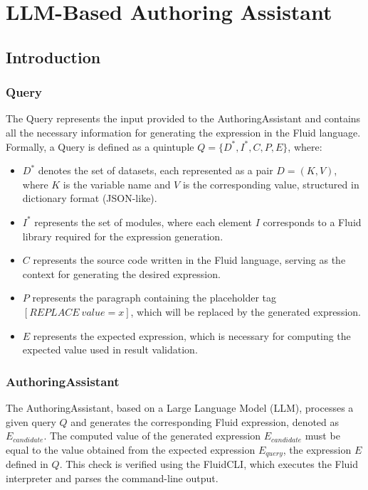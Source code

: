 \section{LLM-Based Authoring Assistant}
\label{sec:llm-based-authoring-assistant}

\subsection{Introduction}
\label{subsec:introduction}

\subsubsection{Query}
The Query represents the input provided to the AuthoringAssistant and contains all the necessary information for generating the expression in the Fluid language.
Formally, a Query is defined as a quintuple $Q = \{D^*, I^*, C, P, E\}$, where:

\begin{itemize}
    \item $D^*$ denotes the set of datasets, each represented as a pair $D = (K, V)$, where $K$ is the variable name and $V$ is the corresponding value, structured in dictionary format (JSON-like).
    \item $I^*$ represents the set of modules, where each element $I$ corresponds to a Fluid library required for the expression generation.
    \item $C$ represents the source code written in the Fluid language, serving as the context for generating the desired expression.
    \item $P$ represents the paragraph containing the placeholder tag $[REPLACE\ value=x]$, which will be replaced by the generated expression.
    \item $E$ represents the expected expression, which is necessary for computing the expected value used in result validation.
\end{itemize}

\subsubsection{AuthoringAssistant}
The AuthoringAssistant, based on a Large Language Model (LLM), processes a given query $Q$ and generates the corresponding Fluid expression, denoted as $E_{candidate}$.
The computed value of the generated expression $E_{candidate}$ must be equal to the value obtained from the expected expression $E_{query}$, the expression $E$ defined in $Q$.
This check is verified using the FluidCLI, which executes the Fluid interpreter and parses the command-line output.

